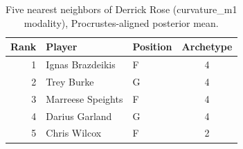 \begin{table}[htbp]
  \centering\small
  \begin{tabular}{rllc}
    \toprule
    Rank & Player & Position & Archetype \\
    \midrule
    1 & Ignas Brazdeikis & F & 4 \\
    2 & Trey Burke & G & 4 \\
    3 & Marreese Speights & F & 4 \\
    4 & Darius Garland & G & 4 \\
    5 & Chris Wilcox & F & 2 \\
    \bottomrule
  \end{tabular}
  \caption{Five nearest neighbors of Derrick Rose (curvature_m1 modality), Procrustes-aligned posterior mean.}
  \label{tab:Derrick_Rose_neighbors_curvature_m1}
\end{table}

